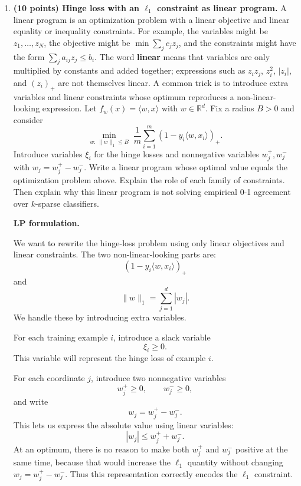 \documentclass[11pt]{article}
\begin{document}
\begin{enumerate}
    \item \textbf{(10 points) Hinge loss with an $\ell_1$ constraint as linear program.}
    \newline
    A linear program is an optimization problem with a linear objective and linear equality or inequality constraints. For example, the variables might be $z_1,\dots,z_N$, the objective might be $\min \sum_j c_jz_j$, and the constraints might have the form $\sum_j a_{ij}z_j \le b_i$. The word \textbf{linear} means that variables are only multiplied by constants and added together; expressions such as $z_iz_j$, $z_i^2$, $|z_i|$, and $(z_i)_+$ are not themselves linear. A common trick is to introduce extra variables and linear constraints whose optimum reproduces a non-linear-looking expression.
    \newline
    Let $f_w(x)=\langle w,x \rangle$ with $w \in \mathbb{R}^d$. Fix a radius $B>0$ and consider
    \[
        \min_{w:\,\|w\|_{1} \le B} \; \frac{1}{m} \sum_{i=1}^{m} \left(1 - y_i \langle w, x_i \rangle \right)_{+}.
    \]
    Introduce variables $\xi_i$ for the hinge losses and nonnegative variables $w_j^+,w_j^-$ with $w_j=w_j^+-w_j^-$. Write a linear program whose optimal value equals the optimization problem above. Explain the role of each family of constraints.
    Then explain why this linear program is not solving empirical 0-1 agreement over $k$-sparse classifiers.

    \begin{solutionbox}

    \textbf{LP formulation.}

    We want to rewrite the hinge-loss problem using only linear objectives and linear constraints.
    The two non-linear-looking parts are:
    \[
    (1-y_i\langle w,x_i\rangle)_+
    \]
    and
    \[
    \|w\|_1=\sum_{j=1}^d |w_j|.
    \]
    We handle these by introducing extra variables.

    For each training example $i$, introduce a slack variable
    \[
    \xi_i\ge 0.
    \]
    This variable will represent the hinge loss of example $i$.

    For each coordinate $j$, introduce two nonnegative variables
    \[
    w_j^+\ge0,
    \qquad
    w_j^-\ge0,
    \]
    and write
    \[
    w_j=w_j^+-w_j^-.
    \]
    This lets us express the absolute value using linear variables:
    \[
    |w_j|\le w_j^++w_j^-.
    \]
    At an optimum, there is no reason to make both $w_j^+$ and $w_j^-$ positive at the same
    time, because that would increase the $\ell_1$ quantity without changing
    $w_j=w_j^+-w_j^-$. Thus this representation correctly encodes the $\ell_1$ constraint.


\end{solutionbox}
\end{enumerate}
\end{document}
